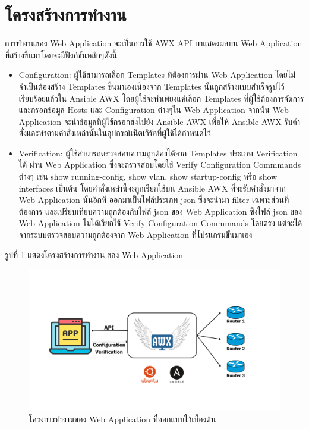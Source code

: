 \section{โครงสร้างการทำงาน}
\hspace{0.5in} การทำงานของ Web Application จะเป็นการใช้ AWX API มาแสดงผลบน Web Application ที่สร้างขึ้นมาโดยจะมีฟังก์ชันหลักๆดังนี้
\begin{itemize}
  \item Configuration: ผู้ใช้สามารถเลือก Templates ที่ต้องการผ่าน Web Application โดยไม่จำเป็นต้องสร้าง Templates ขึ้นมาเองเนื่องจาก Templates นั้นถูกสร้างแบบสำเร็จรูปไว้เรียบร้อยแล้วใน Ansible AWX โดยผู้ใช้จะทำเพียงแค่เลือก Templates ที่ผู้ใช้ต้องการจัดการและกรอกข้อมูล Hosts และ Configuration ต่างๆใน Web Application จากนั้น Web Application จะนำข้อมูลที่ผู้ใช้กรอกส่งไปยัง Ansible AWX เพื่อให้ Ansible AWX รับคำสั่งและทำตามคำสั่งเหล่านั้นในอุปกรณ์เน็ตเวิร์คที่ผู้ใช้ได้กำหนดไว้
  \item Verification: ผู้ใช้สามารถตรวจสอบความถูกต้องได้จาก Templates ประเภท Verification ได้ ผ่าน Web Application ซึ่งจะตรวจสอบโดยใช้ Verify Configuration Commmands ต่างๆ เช่น show running-config, show vlan, show startup-config หรือ show interfaces เป็นต้น โดยคำสั่งเหล่านี้จะถูกเรียกใช้บน Ansible AWX ที่จะรับคำสั่งมาจาก Web Application นั้นอีกที ออกมาเป็นไฟล์ประเภท json ซึ่งจะนำมา filter เฉพาะส่วนที่ต้องการ และเปรียบเทียบความถูกต้องกับไฟล์ json ของ Web Application ซึ่งไฟล์ json ของ Web Application ไม่ได้เรียกใช้ Verify Configuration Commmands โดยตรง แต่จะได้จากระบบตรวจสอบความถูกต้องจาก Web Application ที่โปรแกรมขึั้นมาเอง
\end{itemize}

รูปที่ \ref{fig:api} แสดงโครงสร้างการทำงาน ของ Web Application

\begin{figure}[h]
  \begin{center}
    \includegraphics[scale=0.25]{API.png}
  \end{center}
  \caption[โครงการทำงานของ Web Application ที่ออกแบบไว้เบื้องต้น]{โครงการทำงานของ Web Application ที่ออกแบบไว้เบื้องต้น}
  \label{fig:api}
\end{figure}